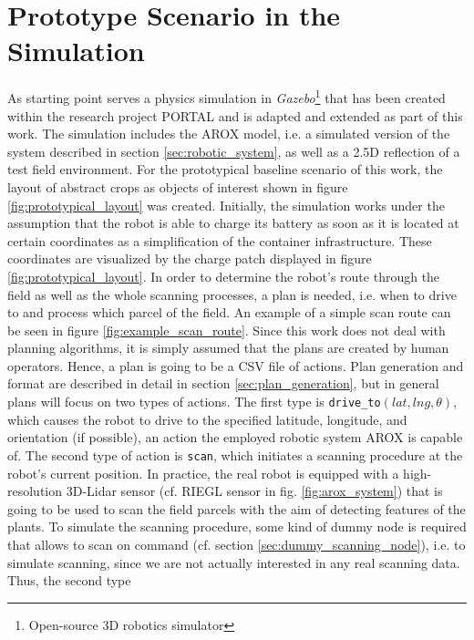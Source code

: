 \documentclass[english, master, utf8]{base/thesis_KBS}
\newcommand{\code}[1]{\colorbox{light-gray}{\texttt{#1}}}
\begin{document}
\pagebreak

\section{Prototype Scenario in the Simulation}
\label{sec:prototype_scenario}

As starting point serves a physics simulation in \textit{Gazebo}\footnote{Open-source 3D robotics simulator} that has been created within the research project PORTAL \cite{portal}
and is adapted and extended as part of this work. The simulation includes the AROX model, i.e. a simulated version of the system described in section \ref{sec:robotic_system},
as well as a 2.5D reflection of a test field environment. For the prototypical baseline scenario of this work, the layout of abstract crops as objects of interest shown in 
figure \ref{fig:prototypical_layout} was created. Initially, the simulation works under the assumption that the robot is able to charge its battery as soon as it is located at 
certain coordinates as a simplification of the container infrastructure. These coordinates are visualized by the charge patch displayed in figure \ref{fig:prototypical_layout}.
In order to determine the robot's route through the field as well as the whole scanning processes, a plan is needed, i.e. when to drive to and process which parcel of the field. 
An example of a simple scan route can be seen in figure \ref{fig:example_scan_route}. Since this work does not deal with planning algorithms, it is simply assumed that the plans
are created by human operators. Hence, a plan is going to be a CSV file of actions. Plan generation and format are described in detail in section \ref{sec:plan_generation}, 
but in general plans will focus on two types of actions. The first type is \code{drive\_to$(lat, lng, \theta)$}, which causes the robot to drive to the specified latitude, 
longitude, and orientation (if possible), an action the employed robotic system AROX is capable of. The second type of action is \code{scan}, which initiates a scanning procedure
at the robot's current position. In practice, the real robot is equipped with a high-resolution 3D-Lidar sensor (cf. RIEGL sensor in fig. \ref{fig:arox_system}) that is going 
to be used to scan the field parcels with the aim of detecting features of the plants. To simulate the scanning procedure, some kind of dummy node is required that allows to 
scan on command (cf. section \ref{sec:dummy_scanning_node}), i.e. to simulate scanning, since we are not actually interested in any real scanning data. Thus, the second type 
\end{document}
